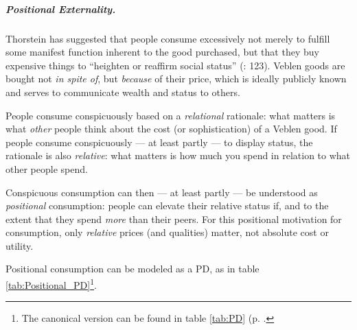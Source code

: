 \subparagraph{Positional Externality.}  \label{sec:positional_race} Thorstein \cite{Veblen1899} has suggested that people consume excessively not merely to fulfill some manifest function inherent to the good purchased, but that they buy expensive things to ``heighten or reaffirm social status'' (\citealt{Merton-1968-aa}: 123). Veblen goods are bought not \emph{in spite of}, but \emph{because} of their price, which is ideally publicly known and serves to communicate wealth and status to others.

People consume conspicuously based on a \emph{relational} rationale: what matters is what \emph{other} people think about the cost (or sophistication) of a Veblen good. If people consume conspicuously --- at least partly --- to display status, the rationale is also \emph{relative}: what matters is how much you spend in relation to what other people spend. 

Conspicuous consumption can then --- at least partly --- be understood as \emph{positional} consumption: people can elevate their relative status if, and to the extent that they spend \emph{more} than their peers. For this positional motivation for consumption, only \emph{relative} prices (and qualities) matter, not absolute cost or utility.

Positional consumption can be modeled as a \gls{PD}, as in table \ref{tab:Positional_PD}\footnote{
	The canonical version can be found in table \ref{tab:PD} (p. \pageref{tab:PD}.}.

